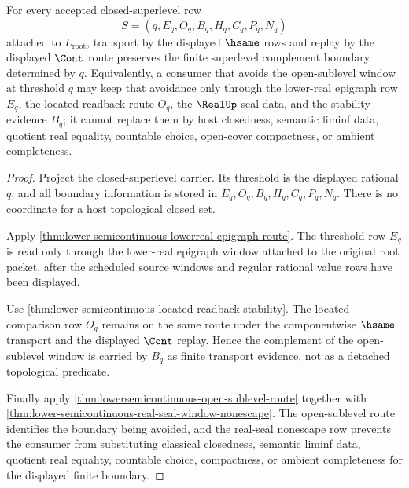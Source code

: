 \begin{theorem}
\label{thm:lowersemicontinuous-closed-superlevel-stability}
For every accepted closed-superlevel row
$$
S=(q,E_q,O_q,B_q,H_q,C_q,P_q,N_q)
$$
attached to $L_{\mathrm{root}}$, transport by the displayed $\hsame$ rows and
replay by the displayed $\Cont$ route preserves the finite superlevel
complement boundary determined by $q$. Equivalently, a consumer that avoids the
open-sublevel window at threshold $q$ may keep that avoidance only through the
lower-real epigraph row $E_q$, the located readback route $O_q$, the $\RealUp$
seal data, and the stability evidence $B_q$; it cannot replace them by host
closedness, semantic liminf data, quotient real equality, countable choice,
open-cover compactness, or ambient completeness.
\end{theorem}
\begin{proof}
Project the closed-superlevel carrier. Its threshold is the displayed rational
$q$, and all boundary information is stored in $E_q,O_q,B_q,H_q,C_q,P_q,N_q$.
There is no coordinate for a host topological closed set.

Apply \autoref{thm:lower-semicontinuous-lowerreal-epigraph-route}. The
threshold row $E_q$ is read only through the lower-real epigraph window
attached to the original root packet, after the scheduled source windows and
regular rational value rows have been displayed.

Use \autoref{thm:lower-semicontinuous-located-readback-stability}. The located
comparison row $O_q$ remains on the same route under the componentwise
$\hsame$ transport and the displayed $\Cont$ replay. Hence the complement of
the open-sublevel window is carried by $B_q$ as finite transport evidence, not
as a detached topological predicate.

Finally apply \autoref{thm:lowersemicontinuous-open-sublevel-route} together
with \autoref{thm:lower-semicontinuous-real-seal-window-nonescape}. The open-sublevel
route identifies the boundary being avoided, and the real-seal nonescape row
prevents the consumer from substituting classical closedness, semantic liminf
data, quotient real equality, countable choice, compactness, or ambient
completeness for the displayed finite boundary.
\end{proof}

